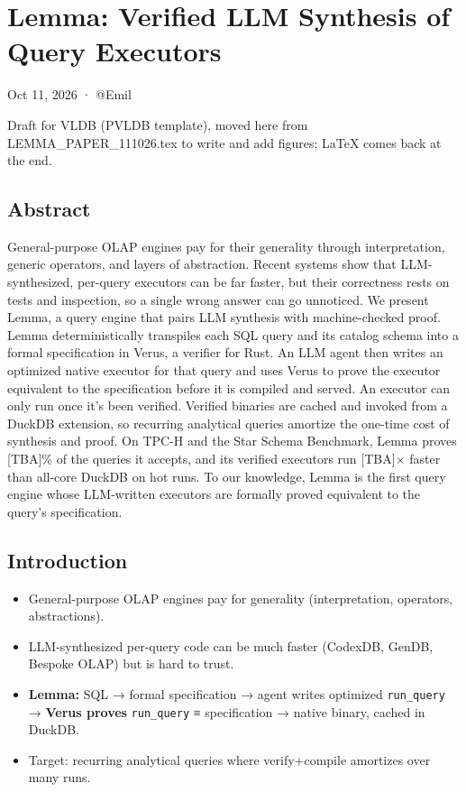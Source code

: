 \documentclass[
]{article}
\author{}
\date{}
\providecommand{\tightlist}{%
  \setlength{\itemsep}{0pt}\setlength{\parskip}{0pt}}
\begin{document}
\section{Lemma: Verified LLM Synthesis of Query
Executors}\label{lemma-verified-llm-synthesis-of-query-executors}

Oct 11, 2026 · @Emil

Draft for VLDB (PVLDB template), moved here from
LEMMA\_PAPER\_111026.tex to write and add figures; LaTeX comes back at
the end.

\subsection{Abstract}\label{abstract}

General-purpose OLAP engines pay for their generality through
interpretation, generic operators, and layers of abstraction. Recent
systems show that LLM-synthesized, per-query executors can be far
faster, but their correctness rests on tests and inspection, so a single
wrong answer can go unnoticed. We present Lemma, a query engine that
pairs LLM synthesis with machine-checked proof. Lemma deterministically
transpiles each SQL query and its catalog schema into a formal
specification in Verus, a verifier for Rust. An LLM agent then writes an
optimized native executor for that query and uses Verus to prove the
executor equivalent to the specification before it is compiled and
served. An executor can only run once it's been verified. Verified
binaries are cached and invoked from a DuckDB extension, so recurring
analytical queries amortize the one-time cost of synthesis and proof. On
TPC-H and the Star Schema Benchmark, Lemma proves {[}TBA{]}\% of the
queries it accepts, and its verified executors run {[}TBA{]}× faster
than all-core DuckDB on hot runs. To our knowledge, Lemma is the first
query engine whose LLM-written executors are formally proved equivalent
to the query's specification.

\subsection{Introduction}\label{introduction}

\begin{itemize}
\tightlist
\item
  General-purpose OLAP engines pay for generality (interpretation,
  operators, abstractions).
\item
  LLM-synthesized per-query code can be much faster (CodexDB, GenDB,
  Bespoke OLAP) but is hard to trust.
\item
  \textbf{Lemma:} SQL → formal specification → agent writes optimized
  \texttt{run\_query} → \textbf{Verus proves} \texttt{run\_query} ≡
  specification → native binary, cached in DuckDB.
\item
  Target: recurring analytical queries where verify+compile amortizes
  over many runs.
\end{itemize}
\end{document}
